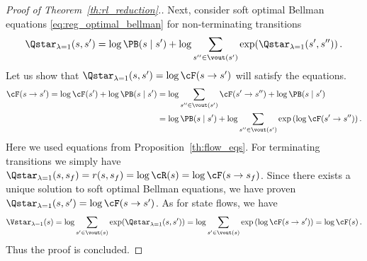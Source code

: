 \begin{proof}[Proof of Theorem~\ref{th:rl_reduction}.]
Next, consider soft optimal Bellman equations \eqref{eq:reg_optimal_bellman} for non-terminating transitions
$$
\Qstar_{\lambda=1}(s, s') = \log \PB(s \mid s') + \log \sum_{s'' \in \vout(s')} \exp(\Qstar_{\lambda=1}(s', s''))\,.
$$
Let us show that $\Qstar_{\lambda=1}(s, s') = \log \cF(s \to s')$ will satisfy the equations.
\begin{equation*} %
\begin{split}
\cF(s \to s')  = \log\cF(s') + \log \PB(s \mid s')& =   \log\sum_{s'' \in \vout(s')} \cF(s' \to s'') + \log \PB(s \mid s')  \\
& = \log \PB(s \mid s') + \log \sum_{s'' \in \vout(s')} \exp\left(\log \cF(s' \to s'')\right).
\end{split}
\end{equation*}
Here we used equations from Proposition~\ref{th:flow_eqs}. For terminating transitions we simply have $\Qstar_{\lambda=1}(s, s_f) = r(s, s_f) = \log \cR(s) = \log \cF(s \to s_f)$. Since there exists a unique solution to soft optimal Bellman equations, we have proven $\Qstar_{\lambda=1}(s, s') = \log \cF(s \to s')$. As for state flows, we have
$$
\Vstar_{\lambda=1}(s) = \log \sum_{s' \in \vout(s)} \exp(\Qstar_{\lambda=1}(s, s')) =  \log \sum_{s' \in \vout(s)} \exp\left(\log \cF(s \to s')\right) =  \log \cF(s)\,.
$$
Thus the proof is concluded.
\end{proof}